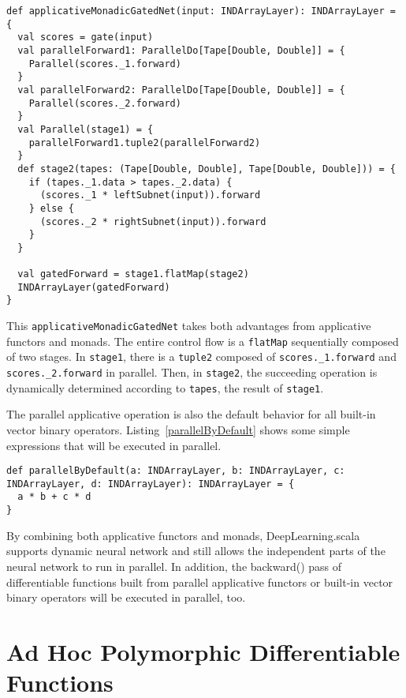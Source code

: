 \begin{lstlisting}[float={h t b p},caption={Applicative + monadic gated network}, label={applicativeMonadicGatedNet}]
def applicativeMonadicGatedNet(input: INDArrayLayer): INDArrayLayer = {
  val scores = gate(input)
  val parallelForward1: ParallelDo[Tape[Double, Double]] = {
    Parallel(scores._1.forward)
  }
  val parallelForward2: ParallelDo[Tape[Double, Double]] = {
    Parallel(scores._2.forward)
  }
  val Parallel(stage1) = {
  	parallelForward1.tuple2(parallelForward2)
  }
  def stage2(tapes: (Tape[Double, Double], Tape[Double, Double])) = {
    if (tapes._1.data > tapes._2.data) {
      (scores._1 * leftSubnet(input)).forward
    } else {
      (scores._2 * rightSubnet(input)).forward
    }
  }

  val gatedForward = stage1.flatMap(stage2)
  INDArrayLayer(gatedForward)
}
\end{lstlisting}

This \lstinline{applicativeMonadicGatedNet} takes both advantages from applicative functors and monads. The entire control flow is a \lstinline{flatMap} sequentially composed of two stages. In \lstinline{stage1}, there is a \lstinline{tuple2} composed of \lstinline{scores._1.forward} and \lstinline{scores._2.forward} in parallel. Then, in \lstinline{stage2}, the succeeding operation is dynamically determined according to \lstinline{tapes}, the result of \lstinline{stage1}.

The parallel applicative operation is also the default behavior for all built-in vector binary operators. Listing~\ref{parallelByDefault} shows some simple expressions that will be executed in parallel.

\begin{lstlisting}[float={h t b p},caption={By default, \lstinline{a * b} and \lstinline{c * d} will be executed in parallel because they are independent}, label={parallelByDefault}]
def parallelByDefault(a: INDArrayLayer, b: INDArrayLayer, c: INDArrayLayer, d: INDArrayLayer): INDArrayLayer = {
  a * b + c * d
}
\end{lstlisting}

By combining both applicative functors and monads, DeepLearning.scala supports dynamic neural network and still allows the independent parts of the neural network to run in parallel. In addition, the backward() pass of differentiable functions built from parallel applicative functors or built-in vector binary operators will be executed in parallel, too.

\section{Ad Hoc Polymorphic Differentiable Functions}
\label{Ad Hoc Polymorphism}

